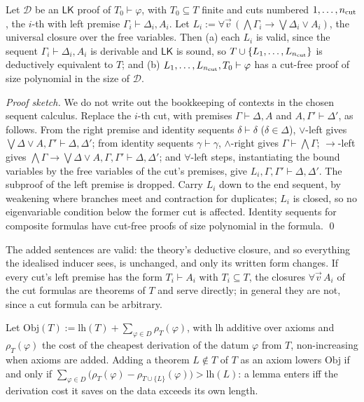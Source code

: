 \begin{remark}\label{rem:shape:cutfree}
Let $\mathcal D$ be an $\mathsf{LK}$ proof of $T_0\vdash\varphi$, with $T_0\subseteq T$ finite and cuts numbered $1,\dots,n_{\rm cut}$, the $i$-th with left premise $\Gamma_i\vdash\Delta_i,A_i$. Let $L_i:=\forall\vec v\,(\bigwedge\Gamma_i\to\bigvee\Delta_i\vee A_i)$, the universal closure over the free variables. Then (a) each $L_i$ is valid, since the sequent $\Gamma_i\vdash\Delta_i,A_i$ is derivable and $\mathsf{LK}$ is sound, so $T\cup\{L_1,\dots,L_{n_{\rm cut}}\}$ is deductively equivalent to $T$; and (b) $L_1,\dots,L_{n_{\rm cut}},T_0\vdash\varphi$ has a cut-free proof of size polynomial in the size of $\mathcal D$.

\emph{Proof sketch.} We do not write out the bookkeeping of contexts in the chosen sequent calculus. Replace the $i$-th cut, with premises $\Gamma\vdash\Delta,A$ and $A,\Gamma'\vdash\Delta'$, as follows. From the right premise and identity sequents $\delta\vdash\delta$ ($\delta\in\Delta$), $\vee$-left gives $\bigvee\Delta\vee A,\Gamma'\vdash\Delta,\Delta'$; from identity sequents $\gamma\vdash\gamma$, $\wedge$-right gives $\Gamma\vdash\bigwedge\Gamma$; $\to$-left gives $\bigwedge\Gamma\to\bigvee\Delta\vee A,\Gamma,\Gamma'\vdash\Delta,\Delta'$; and $\forall$-left steps, instantiating the bound variables by the free variables of the cut's premises, give $L_i,\Gamma,\Gamma'\vdash\Delta,\Delta'$. The subproof of the left premise is dropped. Carry $L_i$ down to the end sequent, by weakening where branches meet and contraction for duplicates; $L_i$ is closed, so no eigenvariable condition below the former cut is affected. Identity sequents for composite formulas have cut-free proofs of size polynomial in the formula. \qed
\end{remark}

The added sentences are valid: the theory's deductive closure, and so everything the idealised inducer sees, is unchanged, and only its written form changes. If every cut's left premise has the form $T_i\vdash A_i$ with $T_i\subseteq T$, the closures $\forall\vec v\,A_i$ of the cut formulas are theorems of $T$ and serve directly; in general they are not, since a cut formula can be arbitrary.

\begin{proposition}\label{prop:shape:lemmaenters}
Let $\mathrm{Obj}(T):=\mathrm{lh}(T)+\sum_{\varphi\in D}\rho_T(\varphi)$, with $\mathrm{lh}$ additive over axioms and $\rho_T(\varphi)$ the cost of the cheapest derivation of the datum $\varphi$ from $T$, non-increasing when axioms are added. Adding a theorem $L\notin T$ of $T$ as an axiom lowers $\mathrm{Obj}$ if and only if $\sum_{\varphi\in D}\bigl(\rho_T(\varphi)-\rho_{T\cup\{L\}}(\varphi)\bigr)>\mathrm{lh}(L)$: a lemma enters iff the derivation cost it saves on the data exceeds its own length.
\end{proposition}

